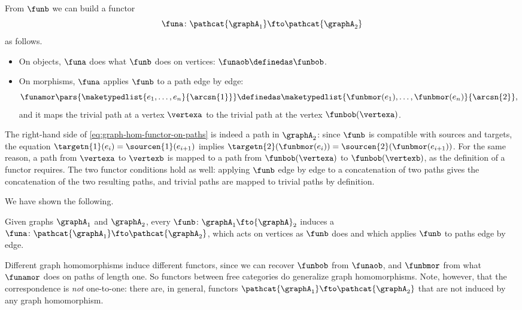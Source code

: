 From $\funb$ we can build a functor
\begin{equation}
    \funa \colon \pathcat{{\graphA}_1} \fto \pathcat{{\graphA}_2}
\end{equation}
as follows.
\begin{itemize}
    \item On objects, $\funa$ does what $\funb$ does on vertices: $\funaob \definedas \funbob$.
    \item On morphisms, $\funa$ applies $\funb$ to a path edge by edge:
          \begin{equation}
              \label{eq:graph-hom-functor-on-paths}
              \funamor\pars{\maketypedlist{e_1, \dots, e_n}{\arcsn{1}}} \definedas \maketypedlist{\funbmor(e_1), \dots, \funbmor(e_n)}{\arcsn{2}},
          \end{equation}
          and it maps the trivial path at a vertex $\vertexa$ to the trivial path at the vertex $\funbob(\vertexa)$.
\end{itemize}
The right-hand side of \cref{eq:graph-hom-functor-on-paths} is indeed a path in ${\graphA}_2$: since $\funb$ is compatible with sources and targets, the equation $\targetn{1}(e_i) = \sourcen{1}(e_{i+1})$ implies $\targetn{2}(\funbmor(e_i)) = \sourcen{2}(\funbmor(e_{i+1}))$.
For the same reason, a path from $\vertexa$ to $\vertexb$ is mapped to a path from $\funbob(\vertexa)$ to $\funbob(\vertexb)$, as the definition of a functor requires.
The two functor conditions hold as well: applying $\funb$ edge by edge to a concatenation of two paths gives the concatenation of the two resulting paths, and trivial paths are mapped to trivial paths by definition.

We have shown the following.

\begin{lemma}
    \label{lem:graph-hom-to-functor}
    Given graphs ${\graphA}_1$ and ${\graphA}_2$, every  $\funb \colon {\graphA}_1 \fto {\graphA}_2$ induces a  $\funa \colon \pathcat{{\graphA}_1} \fto \pathcat{{\graphA}_2}$, which acts on vertices as $\funb$ does and which applies $\funb$ to paths edge by edge.
\end{lemma}

Different graph homomorphisms induce different functors, since we can recover $\funbob$ from $\funaob$, and $\funbmor$ from what $\funamor$ does on paths of length one.
So functors between free categories do generalize graph homomorphisms.
Note, however, that the correspondence is \emph{not} one-to-one: there are, in general, functors $\pathcat{{\graphA}_1} \fto \pathcat{{\graphA}_2}$ that are not induced by any graph homomorphism.

